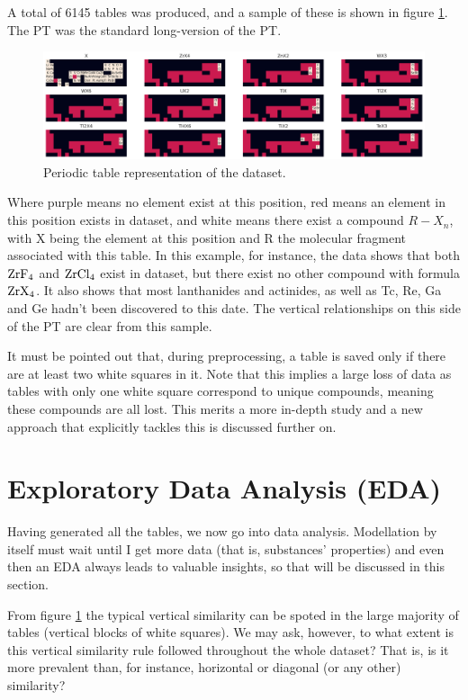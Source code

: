 \documentclass[]{article}
\begin{document}
A total of 6145 tables was produced, and a sample of these is shown in figure \ref{fig:fig1}. The PT was the standard long-version of the PT.

\begin{figure}[h!]
  \centering
	\includegraphics[width=16.0cm]{tables.png}
	\caption{Periodic table representation of the dataset.}
	\label{fig:fig1}
\end{figure}

Where purple means no element exist at this position, red means an element in this position exists in dataset, and white means there exist a compound $R-X_n$, with X being the element at this position and R the molecular fragment associated with this table. In this example, for instance, the data shows that both $\ce{ZrF4}$ and $\ce{ZrCl4}$ exist in dataset, but there exist no other compound with formula $\ce{ZrX4}$. It also shows that most lanthanides and actinides, as well as Tc, Re, Ga and Ge hadn't been discovered to this date. The vertical relationships on this side of the PT are clear from this sample.

It must be pointed out that, during preprocessing, a table is saved only if there are at least two white squares in it. Note that this implies a large loss of data as tables with only one white square correspond to unique compounds, meaning these compounds are all lost. This merits a more in-depth study and a new approach that explicitly tackles this is discussed further on.


\section{Exploratory Data Analysis (EDA)}

Having generated all the tables, we now go into data analysis. Modellation by itself must wait until I get more data (that is, substances' properties) and even then an EDA always leads to valuable insights, so that will be discussed in this section.

From figure \ref{fig:fig1} the typical vertical similarity can be spoted in the large majority of tables (vertical blocks of white squares). We may ask, however, to what extent is this vertical similarity rule followed throughout the whole dataset? That is, is it more prevalent than, for instance, horizontal or diagonal (or any other) similarity?
\end{document}
